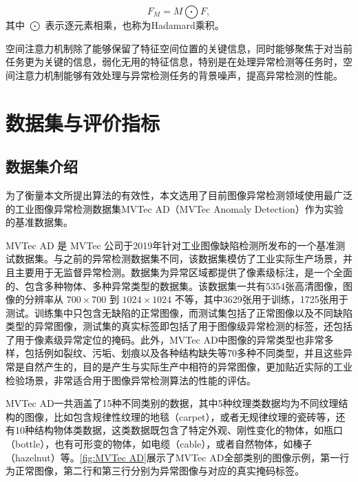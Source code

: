 \documentclass[lang=chs, degree=master, blindreview=false, adobe=false]{yanputhesis}
\begin{document}
\begin{equation}
    \label{eq:F_M}
    F_M = M \bigodot F,
\end{equation}
\noindent
其中 $\bigodot$ 表示逐元素相乘，也称为Hadamard乘积。

空间注意力机制除了能够保留了特征空间位置的关键信息，同时能够聚焦于对当前任务更为关键的信息，弱化无用的特征信息，特别是在处理异常检测等任务时，空间注意力机制能够有效处理与异常检测任务的背景噪声，提高异常检测的性能。

\section{数据集与评价指标}

\subsection{数据集介绍}

为了衡量本文所提出算法的有效性，本文选用了目前图像异常检测领域使用最广泛的工业图像异常检测数据集MVTec AD（MVTec Anomaly Detection）作为实验的基准数据集。

MVTec AD\cite{bergmann2019mvtec} 是 MVTec 公司于2019年针对工业图像缺陷检测所发布的一个基准测试数据集。与之前的异常检测数据集不同，该数据集模仿了工业实际生产场景，并且主要用于无监督异常检测。数据集为异常区域都提供了像素级标注，是一个全面的、包含多种物体、多种异常类型的数据集。该数据集一共有5354张高清图像，图像的分辨率从 $700\times700$ 到 $1024\times1024$ 不等，其中3629张用于训练，1725张用于测试。训练集中只包含无缺陷的正常图像，而测试集包括了正常图像以及不同缺陷类型的异常图像，测试集的真实标签即包括了用于图像级异常检测的标签，还包括了用于像素级异常定位的掩码。此外，MVTec AD中图像的异常类型也非常多样，包括例如裂纹、污垢、划痕以及各种结构缺失等70多种不同类型，并且这些异常是自然产生的，目的是产生与实际生产中相符的异常图像，更加贴近实际的工业检验场景，非常适合用于图像异常检测算法的性能的评估。

MVTec AD一共涵盖了15种不同类别的数据，其中5种纹理类数据均为不同纹理结构的图像，比如包含规律性纹理的地毯（carpet），或者无规律纹理的瓷砖等，还有10种结构物体类数据，这类数据既包含了特定外观、刚性变化的物体，如瓶口（bottle），也有可形变的物体，如电缆（cable），或者自然物体，如榛子（hazelnut）等。\autoref{fig:MVTec AD}展示了MVTec AD全部类别的图像示例，第一行为正常图像，第二行和第三行分别为异常图像与对应的真实掩码标签。
\end{document}
